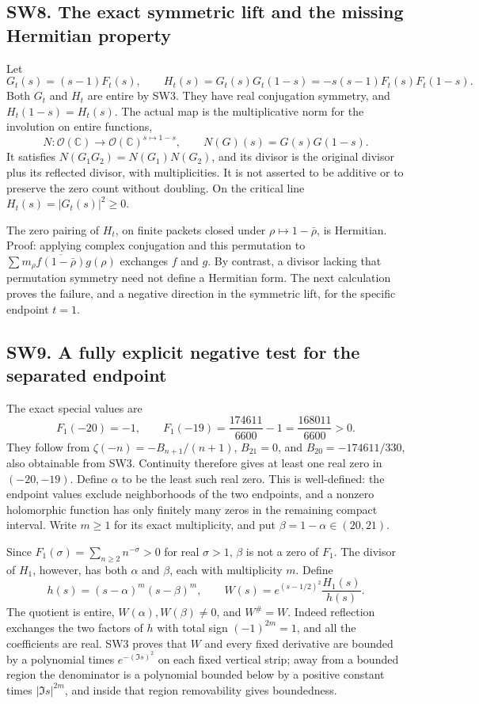 \documentclass[
  10pt,
  a4paper,
]{article}
\begin{document}
\subsection{SW8. The exact symmetric lift and the missing Hermitian
property}\label{sw8.-the-exact-symmetric-lift-and-the-missing-hermitian-property}

Let \[
G_t(s)=(s-1)F_t(s),\qquad
H_t(s)=G_t(s)G_t(1-s)=-s(s-1)F_t(s)F_t(1-s).
\tag{SW26}
\] Both \(G_t\) and \(H_t\) are entire by SW3. They have real
conjugation symmetry, and \(H_t(1-s)=H_t(s)\). The actual map is the
multiplicative norm for the involution on entire functions, \[
N:\mathcal O(\mathbb C)\longrightarrow\mathcal O(\mathbb C)^{s\mapsto1-s},
\qquad N(G)(s)=G(s)G(1-s).
\tag{SW27}
\] It satisfies \(N(G_1G_2)=N(G_1)N(G_2)\), and its divisor is the
original divisor plus its reflected divisor, with multiplicities. It is
not asserted to be additive or to preserve the zero count without
doubling. On the critical line \(H_t(s)=|G_t(s)|^2\ge0\).

The zero pairing of \(H_t\), on finite packets closed under
\(\rho\mapsto1-\bar\rho\), is Hermitian. Proof: applying complex
conjugation and this permutation to
\(\sum m_\rho\overline{f(1-\bar\rho)}g(\rho)\) exchanges \(f\) and
\(g\). By contrast, a divisor lacking that permutation symmetry need not
define a Hermitian form. The next calculation proves the failure, and a
negative direction in the symmetric lift, for the specific endpoint
\(t=1\).

\subsection{SW9. A fully explicit negative test for the separated
endpoint}\label{sw9.-a-fully-explicit-negative-test-for-the-separated-endpoint}

The exact special values are \[
F_1(-20)=-1,\qquad
F_1(-19)=\frac{174611}{6600}-1=\frac{168011}{6600}>0.
\tag{SW28}
\] They follow from \(\zeta(-n)=-B_{n+1}/(n+1)\), \(B_{21}=0\), and
\(B_{20}=-174611/330\), also obtainable from SW3. Continuity therefore
gives at least one real zero in \((-20,-19)\). Define \(\alpha\) to be
the least such real zero. This is well-defined: the endpoint values
exclude neighborhoods of the two endpoints, and a nonzero holomorphic
function has only finitely many zeros in the remaining compact interval.
Write \(m\ge1\) for its exact multiplicity, and put
\(\beta=1-\alpha\in(20,21)\).

Since \(F_1(\sigma)=\sum_{n\ge2}n^{-\sigma}>0\) for real \(\sigma>1\),
\(\beta\) is not a zero of \(F_1\). The divisor of \(H_1\), however, has
both \(\alpha\) and \(\beta\), each with multiplicity \(m\). Define \[
h(s)=(s-\alpha)^m(s-\beta)^m,\qquad
W(s)=e^{(s-1/2)^2}\frac{H_1(s)}{h(s)}.
\tag{SW29}
\] The quotient is entire, \(W(\alpha),W(\beta)\ne0\), and \(W^\#=W\).
Indeed reflection exchanges the two factors of \(h\) with total sign
\((-1)^{2m}=1\), and all the coefficients are real. SW3 proves that
\(W\) and every fixed derivative are bounded by a polynomial times
\(e^{-(\Im s)^2}\) on each fixed vertical strip; away from a bounded
region the denominator is a polynomial bounded below by a positive
constant times \(|\Im s|^{2m}\), and inside that region removability
gives boundedness.
\end{document}
